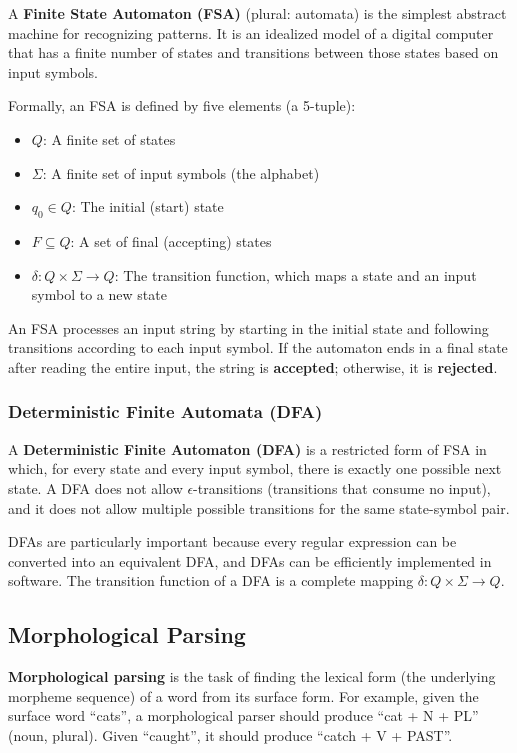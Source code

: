 \documentclass[11pt,a4paper]{article}
\begin{document}
A \textbf{Finite State Automaton (FSA)} (plural: automata) is the simplest abstract machine for recognizing patterns. It is an idealized model of a digital computer that has a finite number of states and transitions between those states based on input symbols.

Formally, an FSA is defined by five elements (a 5-tuple):
\begin{itemize}
    \item $Q$: A finite set of states
    \item $\Sigma$: A finite set of input symbols (the alphabet)
    \item $q_0 \in Q$: The initial (start) state
    \item $F \subseteq Q$: A set of final (accepting) states
    \item $\delta: Q \times \Sigma \to Q$: The transition function, which maps a state and an input symbol to a new state
\end{itemize}

An FSA processes an input string by starting in the initial state and following transitions according to each input symbol. If the automaton ends in a final state after reading the entire input, the string is \textbf{accepted}; otherwise, it is \textbf{rejected}.

\subsubsection{Deterministic Finite Automata (DFA)}

A \textbf{Deterministic Finite Automaton (DFA)} is a restricted form of FSA in which, for every state and every input symbol, there is exactly one possible next state. A DFA does not allow $\epsilon$-transitions (transitions that consume no input), and it does not allow multiple possible transitions for the same state-symbol pair.

DFAs are particularly important because every regular expression can be converted into an equivalent DFA, and DFAs can be efficiently implemented in software. The transition function of a DFA is a complete mapping $\delta: Q \times \Sigma \to Q$.

\subsection{Morphological Parsing}

\textbf{Morphological parsing} is the task of finding the lexical form (the underlying morpheme sequence) of a word from its surface form. For example, given the surface word ``cats'', a morphological parser should produce ``cat + N + PL'' (noun, plural). Given ``caught'', it should produce ``catch + V + PAST''.
\end{document}
